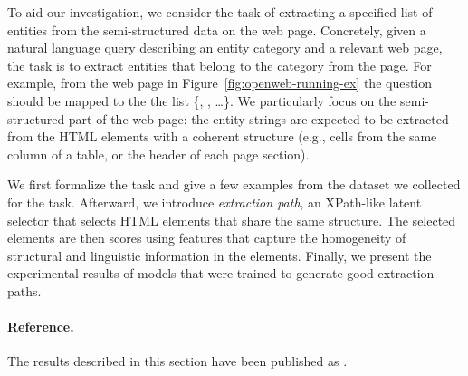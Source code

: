 
To aid our investigation,
we consider the task of
extracting a specified list of entities
from the semi-structured data on the web page.
Concretely, given a natural language query
describing an entity category
and a relevant web page,
the task is to extract entities
that belong to the category from the page.
For example,
from the web page in Figure~\ref{fig:openweb-running-ex}
the question 
should be mapped to the the list
\{, , \dots\}.
We particularly focus on the semi-structured part of the
web page: the entity strings are expected to be extracted
from the HTML elements with a coherent structure
(e.g., cells from the same column of a table,
or the header of each page section).

We first formalize the task and give a few examples
from the  dataset we collected for the task.
Afterward, we introduce \emph{extraction path},
an XPath-like latent selector
that selects HTML elements
that share the same structure.
The selected elements are then scores using
features that capture the homogeneity
of structural and linguistic information in the elements.
Finally, we present the experimental results of models
that were trained to generate good extraction paths.

\paragraph{Reference.}
The results described in this section have been published as
\citet{pasupat2014extraction}.

